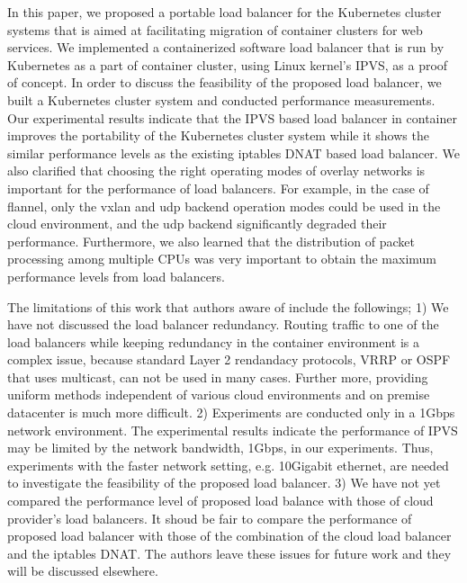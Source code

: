 In this paper, we proposed a portable load balancer for the Kubernetes cluster systems 
that is aimed at facilitating migration of container clusters for web services.
We implemented a containerized software load balancer that is run by Kubernetes as a part of container cluster, 
using Linux kernel's IPVS, as a proof of concept.
In order to discuss the feasibility of the proposed load balancer, we built 
a Kubernetes cluster system and conducted performance measurements.
Our experimental results indicate that the IPVS based load balancer in container improves the portability of 
the Kubernetes cluster system while it shows the similar performance levels as the existing iptables DNAT based load balancer.
We also clarified that choosing the right operating modes of overlay networks is important for the performance of load balancers. 
For example, in the case of flannel, only the vxlan and udp backend operation modes could be used 
in the cloud environment, and the udp backend significantly degraded their performance.
Furthermore, we also learned that the distribution of packet processing among multiple CPUs was very important
to obtain the maximum performance levels from load balancers.
%

The limitations of this work that authors aware of include the followings; 
1) We have not discussed the load balancer redundancy. 
Routing traffic to one of the load balancers while keeping redundancy in the container environment is a complex issue,
because standard Layer 2 rendandacy protocols, VRRP or OSPF\cite{moy1997ospf} that uses multicast, can not be used in many cases.
Further more, providing uniform methods independent of various cloud environments and on premise datacenter is much more difficult.   
2) Experiments are conducted only in a 1Gbps network environment.
The experimental results indicate the performance of IPVS may be limited by the network bandwidth, 1Gbps, in our experiments. 
Thus, experiments with the faster network setting, e.g. 10Gigabit ethernet, are needed to investigate the feasibility of the proposed load balancer.
3) We have not yet compared the performance level of proposed load balance with those of cloud provider's load balancers.
It shoud be fair to compare the performance of proposed load balancer with those of the combination of the cloud load balancer and the iptables DNAT. 
The authors leave these issues for future work and they will be discussed elsewhere.




